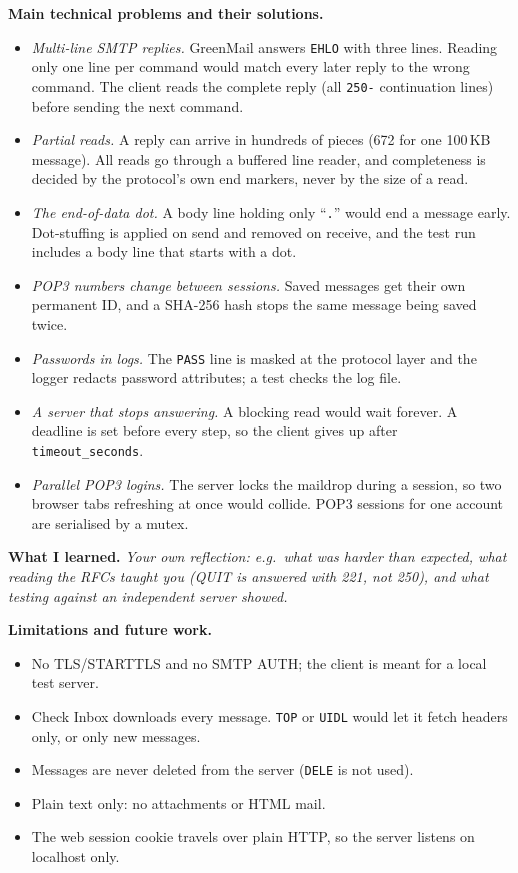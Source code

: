 \documentclass[11pt,a4paper]{article}
\newcommand{\prompt}[1]{\textit{#1}}
\begin{document}
\textbf{Main technical problems and their solutions.}
\begin{itemize}
  \item \emph{Multi-line SMTP replies.} GreenMail answers \texttt{EHLO} with three lines.
        Reading only one line per command would match every later reply to the wrong
        command. The client reads the complete reply (all \texttt{250-} continuation lines)
        before sending the next command.
  \item \emph{Partial reads.} A reply can arrive in hundreds of pieces (672 for one 100\,KB
        message). All reads go through a buffered line reader, and completeness is decided
        by the protocol's own end markers, never by the size of a read.
  \item \emph{The end-of-data dot.} A body line holding only ``\texttt{.}'' would end a
        message early. Dot-stuffing is applied on send and removed on receive, and the test
        run includes a body line that starts with a dot.
  \item \emph{POP3 numbers change between sessions.} Saved messages get their own permanent
        ID, and a SHA-256 hash stops the same message being saved twice.
  \item \emph{Passwords in logs.} The \texttt{PASS} line is masked at the protocol layer and
        the logger redacts password attributes; a test checks the log file.
  \item \emph{A server that stops answering.} A blocking read would wait forever. A deadline
        is set before every step, so the client gives up after \texttt{timeout\_seconds}.
  \item \emph{Parallel POP3 logins.} The server locks the maildrop during a session, so two
        browser tabs refreshing at once would collide. POP3 sessions for one account are
        serialised by a mutex.
\end{itemize}

\textbf{What I learned.} \prompt{Your own reflection: e.g.\ what was harder than expected,
what reading the RFCs taught you (QUIT is answered with 221, not 250), and what testing
against an independent server showed.}

\textbf{Limitations and future work.}
\begin{itemize}
  \item No TLS/STARTTLS and no SMTP AUTH; the client is meant for a local test server.
  \item Check Inbox downloads every message. \texttt{TOP} or \texttt{UIDL} would let it fetch
        headers only, or only new messages.
  \item Messages are never deleted from the server (\texttt{DELE} is not used).
  \item Plain text only: no attachments or HTML mail.
  \item The web session cookie travels over plain HTTP, so the server listens on localhost
        only.
\end{itemize}
\end{document}
